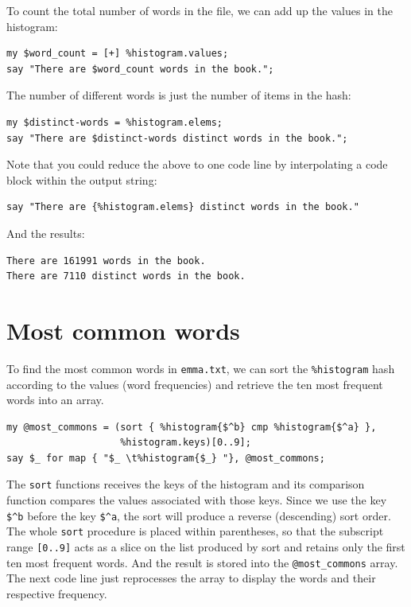 To count the total number of words in the file, we can add up
the values in the histogram:

\begin{verbatim}
my $word_count = [+] %histogram.values;
say "There are $word_count words in the book.";
\end{verbatim}
%
The number of different words is just the number of items in
the hash:

\begin{verbatim}
my $distinct-words = %histogram.elems;
say "There are $distinct-words distinct words in the book.";
\end{verbatim}
%
Note that you could reduce the above to one code line by 
interpolating a code block within the output string:

\begin{verbatim}
say "There are {%histogram.elems} distinct words in the book."
\end{verbatim}
%
And the results:

\begin{verbatim}
There are 161991 words in the book.
There are 7110 distinct words in the book.
\end{verbatim}
%


\section{Most common words}
\label{most_common_words}

To find the most common words in \verb'emma.txt', we can 
sort the \verb'%histogram' hash according to the values 
(word frequencies) and retrieve the ten most frequent words 
into an array.

\begin{verbatim}
my @most_commons = (sort { %histogram{$^b} cmp %histogram{$^a} }, 
                    %histogram.keys)[0..9];
say $_ for map { "$_ \t%histogram{$_} "}, @most_commons;
\end{verbatim}

The {\tt sort} functions receives the keys of the histogram and 
its comparison function compares the values associated with 
those keys. Since we use the key \verb'$^b' before the key 
\verb'$^a', the sort will produce a reverse (descending) sort 
order. The whole {\tt sort} procedure is placed within parentheses, 
so that the subscript range {\tt [0..9]} acts as a slice on 
the list produced by sort and retains only the first ten most 
frequent words. And the result is stored into the 
\verb'@most_commons' array. The next code line just reprocesses 
the array to display the words and their respective frequency.

